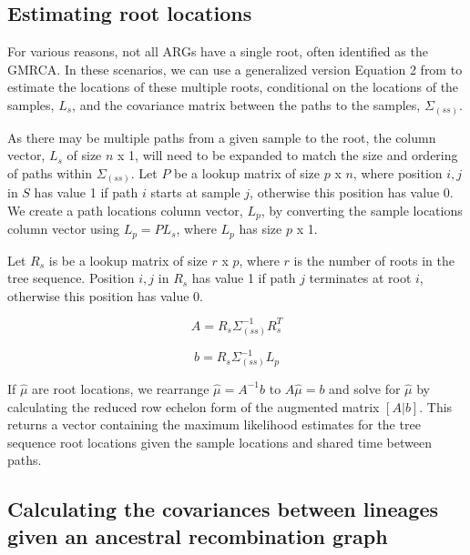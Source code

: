 

\subsection{Estimating root locations}

For various reasons, not all ARGs have a single root, often identified as the GMRCA. In these scenarios, we can use a generalized version Equation 2 from \cite{Osmond2021} to estimate the locations of these multiple roots, conditional on the locations of the samples, $L_s$, and the covariance matrix between the paths to the samples, $\Sigma_{(ss)}$.

As there may be multiple paths from a given sample to the root, the column vector, $L_s$ of size $n$ x 1, will need to be expanded to match the size and ordering of paths within $\Sigma_{(ss)}$. Let $P$ be a lookup matrix of size $p$ x $n$, where position $i,j$ in $S$ has value 1 if path $i$ starts at sample $j$, otherwise this position has value 0. We create a path locations column vector, $L_p$, by converting the sample locations column vector using $L_p=PL_s$, where $L_p$ has size $p$ x 1.

Let $R_s$ is be a lookup matrix of size $r$ x $p$, where $r$ is the number of roots in the tree sequence. Position $i,j$ in $R_s$ has value 1 if path $j$ terminates at root $i$, otherwise this position has value 0.

\begin{equation}
    \label{eq:location_of_roots}
    A = R_s\Sigma_{(ss)}^{-1}R_s^T
\end{equation}

\begin{equation}
    b = R_s\Sigma_{(ss)}^{-1}L_p
\end{equation}

If $\widehat{\mu}$ are root locations, we rearrange $\widehat{\mu}=A^{-1}b$ to $A\widehat{\mu}=b$ and solve for $\widehat{\mu}$ by calculating the reduced row echelon form of the augmented matrix $[A|b]$. This returns a vector containing the maximum likelihood estimates for the tree sequence root locations given the sample locations and shared time between paths.


\subsection{Calculating the covariances between lineages given an ancestral recombination graph}

